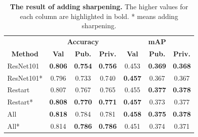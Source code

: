 \documentclass[10pt,twocolumn,letterpaper]{article}
\begin{document}
\begin{table}[h]
  \centering
  \setlength{\tabcolsep}{3.5pt}
  \begin{tabular}{lcccccc}
    \toprule
                                        & \multicolumn{3}{c}{\textbf{Accuracy}}            & \multicolumn{3}{c}{\textbf{mAP}}                 \\
    \cmidrule[0.3pt](lr){2-4} \cmidrule(lr){5-7}
    \multicolumn{1}{c}{\textbf{Method}} & \textbf{Val}   & \textbf{Pub.}  & \textbf{Priv.} & \textbf{Val}   & \textbf{Pub.}  & \textbf{Priv.} \\
    \midrule
    ResNet101                           & \textbf{0.806} & \textbf{0.754} & \textbf{0.756} & 0.453          & \textbf{0.369} & \textbf{0.368} \\
    ResNet101*                          & 0.796          & 0.733          & 0.740          & \textbf{0.457} & 0.367          & 0.367          \\
    \midrule
    Restart                             & 0.807          & 0.767          & 0.765          & 0.455          & \textbf{0.377} & \textbf{0.378} \\
    Restart*                            & \textbf{0.808} & \textbf{0.770} & \textbf{0.771} & \textbf{0.457} & 0.373          & 0.377          \\
    \midrule
    All                                 & \textbf{0.818} & 0.784          & 0.781          & \textbf{0.458} & \textbf{0.375} & \textbf{0.378} \\
    All*                                & 0.814          & \textbf{0.786} & \textbf{0.786} & 0.451          & 0.374          & 0.371          \\
    \bottomrule
  \end{tabular}
  \caption{\textbf{The result of adding sharpening.} The higher values
    for each column are highlighted in bold. * means adding sharpening.
  }
  \label{tab:sharp}
\end{table}

{\small


}
\end{document}
